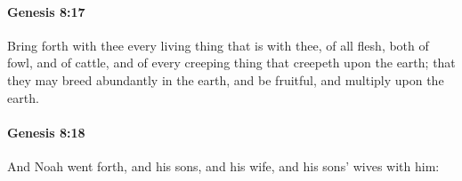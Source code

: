 		\paragraph{Genesis 8:17} %
			\label{GENESIS-8-17}

			Bring forth with thee every living thing that is with thee, of all flesh, both of fowl, and of cattle, and of every creeping thing that creepeth upon the earth; that they may breed abundantly in the earth, and be fruitful, and multiply upon the earth.


		\paragraph{Genesis 8:18} %
			\label{GENESIS-8-18}

			And Noah went forth, and his sons, and his wife, and his sons' wives with him:



